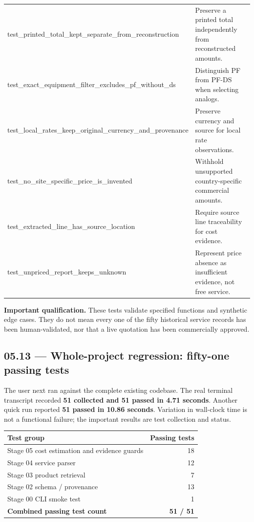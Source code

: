 \documentclass[11pt,a4paper]{article}
\DeclareRobustCommand{\code}[1]{{\ttfamily\small\detokenize{#1}}}
\begin{document}
\begin{longtable}{@{}L{76mm}L{70mm}@{}}
{\footnotesize\ttfamily test\_\allowbreak printed\_\allowbreak total\_\allowbreak kept\_\allowbreak separate\_\allowbreak from\_\allowbreak reconstruction} & Preserve a printed total independently from reconstructed amounts.\\
{\footnotesize\ttfamily test\_\allowbreak exact\_\allowbreak equipment\_\allowbreak filter\_\allowbreak excludes\_\allowbreak pf\_\allowbreak without\_\allowbreak ds} & Distinguish PF from PF-DS when selecting analogs.\\
{\footnotesize\ttfamily test\_\allowbreak local\_\allowbreak rates\_\allowbreak keep\_\allowbreak original\_\allowbreak currency\_\allowbreak and\_\allowbreak provenance} & Preserve currency and source for local rate observations.\\
{\footnotesize\ttfamily test\_\allowbreak no\_\allowbreak site\_\allowbreak specific\_\allowbreak price\_\allowbreak is\_\allowbreak invented} & Withhold unsupported country-specific commercial amounts.\\
{\footnotesize\ttfamily test\_\allowbreak extracted\_\allowbreak line\_\allowbreak has\_\allowbreak source\_\allowbreak location} & Require source line traceability for cost evidence.\\
{\footnotesize\ttfamily test\_\allowbreak unpriced\_\allowbreak report\_\allowbreak keeps\_\allowbreak unknown} & Represent price absence as insufficient evidence, not free service.\\
\bottomrule
\end{longtable}

\textbf{Important qualification.} These tests validate specified functions and synthetic edge cases. They do not mean every one of the fifty historical service records has been human-validated, nor that a live quotation has been commercially approved.

\subsection{05.13 --- Whole-project regression: fifty-one passing tests}
The user next ran \code{python -m pytest -v} against the complete existing codebase. The real terminal transcript recorded \textbf{51 collected and 51 passed in 4.71 seconds}. Another quick run reported \textbf{51 passed in 10.86 seconds}. Variation in wall-clock time is not a functional failure; the important results are test collection and status.

\begin{tabularx}{\textwidth}{@{}Y r@{}}
\toprule
\textbf{Test group} & \textbf{Passing tests}\\
\midrule
Stage 05 cost estimation and evidence guards & 18\\
Stage 04 service parser & 12\\
Stage 03 product retrieval & 7\\
Stage 02 schema / provenance & 13\\
Stage 00 CLI smoke test & 1\\
\midrule
\textbf{Combined passing test count} & \textbf{51 / 51}\\
\bottomrule
\end{tabularx}
\end{document}
